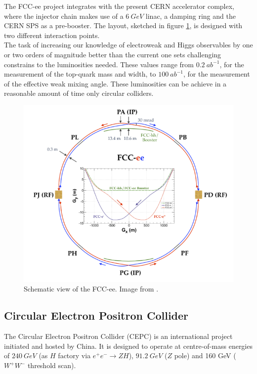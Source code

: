The FCC-ee project integrates with the present CERN accelerator complex, where the injector chain makes use of a $6\ GeV$ linac, a damping ring and the CERN SPS as a pre-booster. The layout, sketched in figure \ref{fig:FCC-ee}, is designed with two different interaction points.\\
The task of increasing our knowledge of electroweak and Higgs observables by one or two orders of magnitude better than the current one sets challenging constrains to the luminosities needed. These values range from $0.2\ ab^{-1}$, for the measurement of the top-quark mass and width, to $100\ ab^{-1}$, for the measurement of the effective weak mixing angle.
These luminosities can be achieve in a reasonable amount of time only circular colliders. 

\begin{figure}
	\centering
	\includegraphics[width=.7\textwidth]{IMG/Cap1/FCC-ee.png}
	\caption{ Schematic view of the FCC-ee. Image from \cite{FCC}.}
	\label{fig:FCC-ee}
\end{figure}

\subsection*{Circular Electron Positron Collider}
The Circular Electron Positron Collider (CEPC) is an international project initiated and hosted by China. It is designed to operate at centre-of-mass energies of $240\ GeV$ (as $H$ factory via $e^+e^- \rightarrow ZH$), $91.2\ GeV$ ($Z$ pole) and 160 GeV ($W^+W^-$ threshold scan).\\

